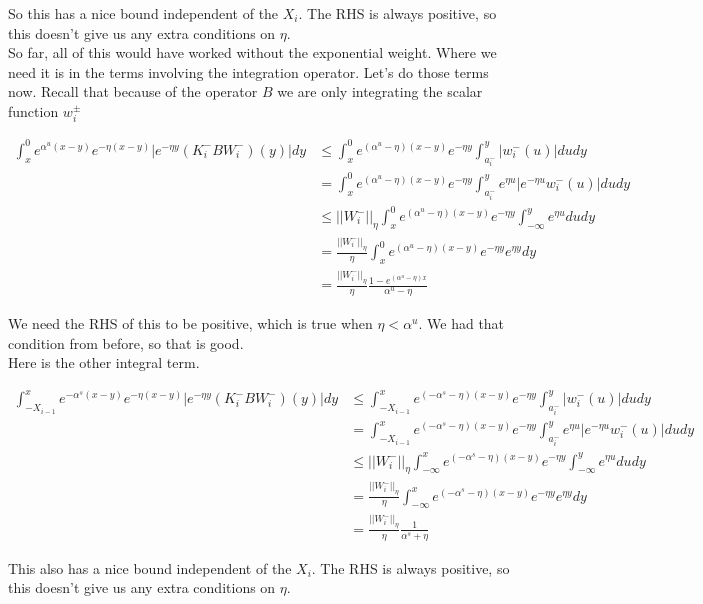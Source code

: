 \documentclass[12pt]{article}
\begin{document}
So this has a nice bound independent of the $X_i$. The RHS is always positive, so this doesn't give us any extra conditions on $\eta$. \\

So far, all of this would have worked without the exponential weight. Where we need it is in the terms involving the integration operator. Let's do those terms now. Recall that because of the operator $B$ we are only integrating the scalar function $w_i^\pm$

\begin{align*}
\int_x^0 e^{\alpha^u (x-y)}e^{-\eta(x-y)}|e^{-\eta y} (K_i^- B W_i^-)(y)| dy &\leq \int_x^0 e^{(\alpha^u - \eta)(x-y)}e^{-\eta y} \int_{a_i^-}^y |w_i^-(u)| du dy \\
&= \int_x^0 e^{(\alpha^u - \eta)(x-y)}e^{-\eta y} \int_{a_i^-}^y e^{\eta u} |e^{-\eta u} w_i^-(u)| du dy \\
&\leq ||W_i^-||_\eta \int_x^0 e^{(\alpha^u - \eta)(x-y)}e^{-\eta y} \int_{-\infty}^y e^{\eta u} du dy \\
&= \frac{||W_i^-||_\eta}{\eta} \int_x^0 e^{(\alpha^u - \eta)(x-y)}e^{-\eta y} e^{\eta y} dy \\
&= \frac{||W_i^-||_\eta}{\eta} \frac{1 - e^{(\alpha^u - \eta)x}}{\alpha^u - \eta} 
\end{align*}

We need the RHS of this to be positive, which is true when $\eta < \alpha^u$. We had that condition from before, so that is good.\\

Here is the other integral term. 

\begin{align*}
\int_{-X_{i-1}}^x e^{-\alpha^s (x-y)}e^{-\eta(x-y)}|e^{-\eta y} (K_i^- B W_i^-)(y)| dy &\leq \int_{-X_{i-1}}^x e^{(-\alpha^s - \eta)(x-y)}e^{-\eta y} \int_{a_i^-}^y |w_i^-(u)| du dy \\
&= \int_{-X_{i-1}}^x e^{(-\alpha^s - \eta)(x-y)}e^{-\eta y} \int_{a_i^-}^y e^{\eta u} |e^{-\eta u} w_i^-(u)| du dy \\
&\leq ||W_i^-||_\eta \int_{-\infty}^x e^{(-\alpha^s - \eta)(x-y)}e^{-\eta y} \int_{-\infty}^y e^{\eta u} du dy \\
&= \frac{||W_i^-||_\eta}{\eta} \int_{-\infty}^x e^{(-\alpha^s - \eta)(x-y)}e^{-\eta y} e^{\eta y} dy \\
&= \frac{||W_i^-||_\eta}{\eta} \frac{1}{\alpha^s + \eta}
\end{align*}

This also has a nice bound independent of the $X_i$. The RHS is always positive, so this doesn't give us any extra conditions on $\eta$.\\
\end{document}
